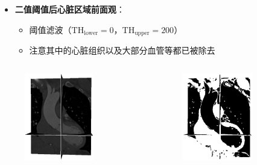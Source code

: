 
\begin{frame}
\begin{itemize}
  \item \textbf{二值阈值后心脏区域前面观}：
  \begin{itemize}
     \item 阈值滤波（$\text{TH}_{\text{lower}} = 0$，$\text{TH}_{\text{upper}} = 200$）
     \item 注意其中的心脏组织以及大部分血管等都已被除去
  \end{itemize}
\end{itemize}
\begin{columns}[b,onlytextwidth]
\begin{column}{.5\textwidth}
 \begin{figure}
\centering
\includegraphics[height=1.5in]{../../Figures/gac/heart/original.eps}
\end{figure}
\end{column}
\begin{column}{.5\textwidth}
 \begin{figure}
\centering
\includegraphics[height=1.5in]{../../Figures/gac/heart/binary_threshold.eps}
\end{figure}
\end{column}
\end{columns}
\end{frame}

